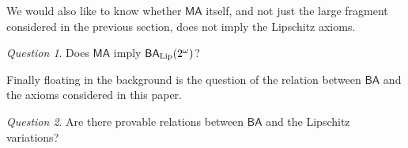 \documentclass[leqno,11pt]{amsart}
\theoremstyle{definition}
\theoremstyle{remark}
\newtheorem{question}{Question}
\def\MA{\mathsf{MA}}
\def\BA{\mathsf{BA}}
\def\cantor{2^\omega}
\begin{document}
We would also like to know whether $\MA$ itself, and not just the large fragment considered in the previous section, does not imply the Lipschitz axioms.
\begin{question}
    Does $\MA$ imply $\BA_{\rm Lip}(\cantor)$?
\end{question}
Finally floating in the background is the question of the relation between $\BA$ and the axioms considered in this paper.
\begin{question}
    Are there provable relations between $\BA$ and the Lipschitz variations?
\end{question}



\end{document}
